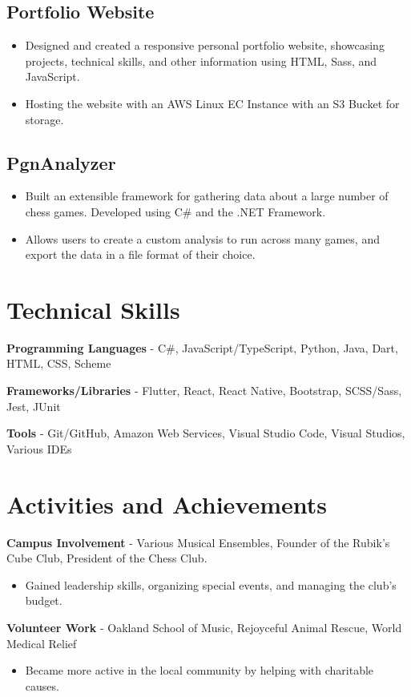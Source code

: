 \documentclass{article}
\newcommand{\resumesection}[1]{
	\section*{\Large\textbf{#1}}
	\hrulefill
	\vspace{1ex}
}
\begin{document}
\subsection*{Portfolio Website}

\begin{itemize}
	\item Designed and created a responsive personal portfolio website, showcasing projects, technical skills, and other information using HTML, Sass, and JavaScript.
	\item Hosting the website with an AWS Linux EC Instance with an S3 Bucket for storage.
\end{itemize}

\subsection*{PgnAnalyzer}

\begin{itemize}
	\item Built an extensible framework for gathering data about a large number of chess games. Developed using C\# and the .NET Framework. 
	\item Allows users to create a custom analysis to run across many games, and export the data in a file format of their choice.
\end{itemize}


\resumesection{Technical Skills}

\vspace{.2ex}

\textbf{Programming Languages} - C\#,  JavaScript/TypeScript, Python, Java, Dart, HTML, CSS, Scheme

\textbf{Frameworks/Libraries} - Flutter, React, React Native, Bootstrap, SCSS/Sass, Jest, JUnit

\textbf{Tools} - Git/GitHub, Amazon Web Services, Visual Studio Code, Visual Studios, Various IDEs

\vspace{.5ex}


\resumesection{Activities and Achievements}

\vspace{.2ex}

\textbf {Campus Involvement} - Various Musical Ensembles, Founder of the Rubik's Cube Club, President of the Chess Club.


	\begin{itemize}
		\item Gained leadership skills, organizing special events, and managing the club's budget.
	\end{itemize}

\textbf {Volunteer Work} - Oakland School of Music, Rejoyceful Animal Rescue, World Medical Relief

	\begin{itemize}
		\item Became more active in the local community by helping with charitable causes.
	\end{itemize}
\end{document}

